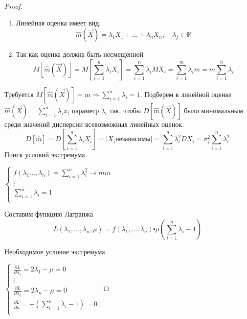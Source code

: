 \documentclass[a4paper, 12pt]{article}
\theoremstyle{definition}
\theoremstyle{leads}
\theoremstyle{example}
\begin{document}
\begin{proof}
	\begin{enumerate}
		\item Линейная оценка имеет вид:
		 \begin{equation*}
		 	\hat{m}(\vec{X}) = \lambda_1 X_1 + \dots + \lambda_n X_n, \quad \lambda_j \in \mathbb{R}
		 \end{equation*}
		\item Так как оценка должна быть несмещенной
		\begin{equation*}
		M[\hat{m}(\vec{X})] = M[\sum_{i=1}^{n} \lambda_i X_i] = \sum_{i=1}^{n} \lambda_i MX_i = \sum_{i=1}^{m}\lambda_i m = m \sum_{i=1}^{n} \lambda_i
		\end{equation*}
	\end{enumerate}
Требуется $M[\hat{m}(\vec{X})] = m \Longrightarrow \sum_{i=1}^{n} \lambda_i = 1$.
Подберем в линейной оценке $\hat{m}(\vec{X}) = \sum_{i=1}^{n}\lambda_i x_i$ параметр $\lambda_i$ так, чтобы $D[\hat{m}(\vec{X})]$ было минимальным среди значений дисперсии всевозможных линейных оценок.
\begin{equation*}
	D[\hat{m}] = D[\sum_{i=1}^{n}\lambda_i X_i] = |X_i независимы| = \sum_{i=1}^{n} \lambda_i^2 DX_i = \sigma_i^2 \sum_{i=1}^{n} \lambda_i^2
\end{equation*}
 Поиск условий экстремума.\newline
 
$\left \{
\begin{array}{ccc}
f(\lambda_1 \dots, \lambda_n) = \sum_{i=1}^{n} \lambda_i^2 \longrightarrow min\\
\vdots\\
\sum_{i=1}^{n} \lambda_i = 1\\
\end{array}
\right.$\newline

Составим функцию Лагранжа
\begin{equation*}
	L(\lambda_1, \dots, \lambda_n, \mu) = f(\lambda_1, \dots, \lambda_n) \centerdot \mu(\sum_{i=1}^{n} \lambda_i - 1)
\end{equation*}

Необходимое условие экстремума

$\left \{
\begin{array}{ccc}
\frac{\partial L}{\partial \lambda_1} = 2 \lambda_1 - \mu  = 0\\
\vdots\\
\frac{\partial L}{\partial \lambda_n} = 2 \lambda_n - \mu  = 0\\
\frac{\partial L}{\partial \mu} = - (\sum_{i=1}^{n} \lambda_i - 1) = 0 \\
\end{array}
\right.$\newline


\end{proof}
\end{document}
